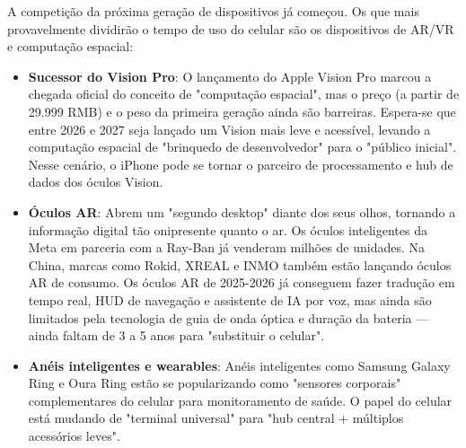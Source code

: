 


A competição da próxima geração de dispositivos já começou. Os que mais provavelmente dividirão o tempo de uso do celular são os dispositivos de AR/VR e computação espacial:

\begin{itemize}
  \item \textbf{Sucessor do Vision Pro}: O lançamento do Apple Vision Pro marcou a chegada oficial do conceito de "computação espacial", mas o preço (a partir de 29.999 RMB) e o peso da primeira geração ainda são barreiras. Espera-se que entre 2026 e 2027 seja lançado um Vision mais leve e acessível, levando a computação espacial de "brinquedo de desenvolvedor" para o "público inicial". Nesse cenário, o iPhone pode se tornar o parceiro de processamento e hub de dados dos óculos Vision.
  \item \textbf{Óculos AR}: Abrem um "segundo desktop" diante dos seus olhos, tornando a informação digital tão onipresente quanto o ar. Os óculos inteligentes da Meta em parceria com a Ray-Ban já venderam milhões de unidades. Na China, marcas como Rokid, XREAL e INMO também estão lançando óculos AR de consumo. Os óculos AR de 2025-2026 já conseguem fazer tradução em tempo real, HUD de navegação e assistente de IA por voz, mas ainda são limitados pela tecnologia de guia de onda óptica e duração da bateria — ainda faltam de 3 a 5 anos para "substituir o celular".
  \item \textbf{Anéis inteligentes e wearables}: Anéis inteligentes como Samsung Galaxy Ring e Oura Ring estão se popularizando como "sensores corporais" complementares do celular para monitoramento de saúde. O papel do celular está mudando de "terminal universal" para "hub central + múltiplos acessórios leves".
\end{itemize}


